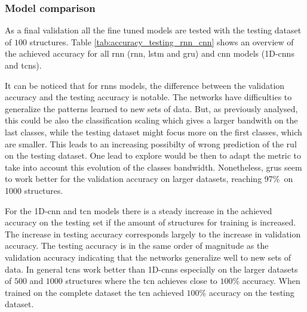 \documentclass[conference]{IEEEtran}
\begin{document}
\subsubsection{Model comparison}
\label{sec:model_comparison}


As a final validation all the fine tuned models are tested with the testing dataset of $ 100 $ structures. Table \ref{tab:accuracy_testing_rnn_cnn} shows an overview of the achieved accuracy for all \gls{rnn} (\gls{rnn}, \gls{lstm} and \gls{gru}) and \gls{cnn} models (1D-\glspl{cnn} and \glspl{tcn}).


It can be noticed that for \glspl{rnn} models, the difference between the validation accuracy and the testing accuracy is notable. The networks have difficulties to generalize the patterns learned to new sets of data. But, as previously analysed, this could be also the classification scaling which gives a larger bandwith on the last classes, while the testing dataset might focus more on the first classes, which are smaller. This leads to an increasing possibilty of wrong prediction of the \gls{rul} on the testing dataset. One lead to explore would be then to adapt the metric to take into account this evolution of the classes bandwidth. Nonetheless, \glspl{gru} seem to work better for the validation accuracy on larger datasets, reaching 97\%\ on 1000 structures.

For the 1D-\gls{cnn} and \gls{tcn} models there is a steady increase in the achieved accuracy on the testing set if the amount of structures for training is increased. The increase in testing accuracy corresponds largely to the increase in validation accuracy. The testing accuracy is in the same order of magnitude as the validation accuracy indicating that the networks generalize well to new sets of data. In general \glspl{tcn} work better than 1D-\glspl{cnn} especially on the larger datasets of $ 500 $ and $ 1000 $ structures where the \gls{tcn} achieves close to $ 100 \% $ accuracy. When trained on the complete dataset the \gls{tcn} achieved $ 100 \% $ accuracy on the testing dataset.

\end{document}
